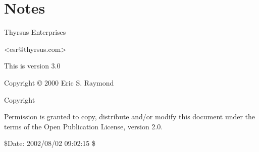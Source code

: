 \section{Notes}

Thyrsus Enterprises

<esr@thyrsus.com>

This is version 3.0

Copyright © 2000 Eric S. Raymond

Copyright

Permission is granted to copy, distribute and/or modify this document under the
terms of the Open Publication License, version 2.0.

\$Date: 2002/08/02 09:02:15 \$
